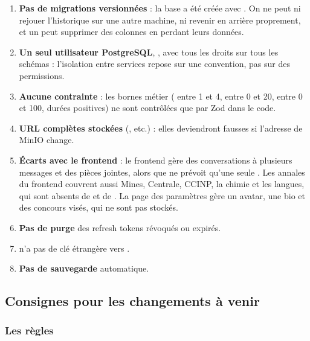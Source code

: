 \begin{enumerate}
  \item \textbf{Pas de migrations versionnées} : la base a été créée avec . On ne peut ni rejouer l'historique sur une autre machine, ni revenir en arrière proprement, et un  peut supprimer des colonnes en perdant leurs données.
  \item \textbf{Un seul utilisateur PostgreSQL}, , avec tous les droits sur tous les schémas : l'isolation entre services repose sur une convention, pas sur des permissions.
  \item \textbf{Aucune contrainte } : les bornes métier ( entre 1 et 4,  entre 0 et 20,  entre 0 et 100, durées positives) ne sont contrôlées que par Zod dans le code.
  \item \textbf{URL complètes stockées} (, etc.) : elles deviendront fausses si l'adresse de MinIO change.
  \item \textbf{Écarts avec le frontend} : le frontend gère des conversations à plusieurs messages et des pièces jointes, alors que  ne prévoit qu'une seule . Les annales du frontend couvrent aussi Mines, Centrale, CCINP, la chimie et les langues, qui sont absents de  et de . La page des paramètres gère un avatar, une bio et des concours visés, qui ne sont pas stockés.
  \item \textbf{Pas de purge} des refresh tokens révoqués ou expirés.
  \item \textbf{} n'a pas de clé étrangère vers .
  \item \textbf{Pas de sauvegarde} automatique.
\end{enumerate}

\subsection{Consignes pour les changements à venir}

\subsubsection{Les règles}

